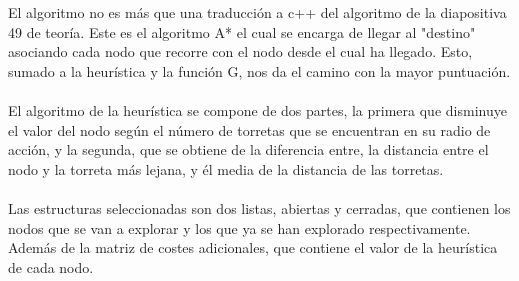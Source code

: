 El algoritmo no es más que una traducción a c++ del algoritmo de la diapositiva 49 de teoría. Este es el algoritmo A* el cual se encarga de llegar al "destino" asociando cada nodo que recorre con el nodo desde el cual ha llegado. Esto, sumado a la heurística y la función G, nos da el camino con la mayor puntuación.\\
\\
El algoritmo de la heurística se compone de dos partes, la primera que disminuye el valor del nodo según el número de torretas que se encuentran en su radio de acción, y la segunda, que se obtiene de la diferencia entre, la distancia entre el nodo y la torreta más lejana, y él media de la distancia de las torretas.\\
\\
Las estructuras seleccionadas son dos listas, abiertas y cerradas, que contienen los nodos que se van a explorar y los que ya se han explorado respectivamente. Además de la matriz de costes adicionales, que contiene el valor de la heurística de cada nodo.\\